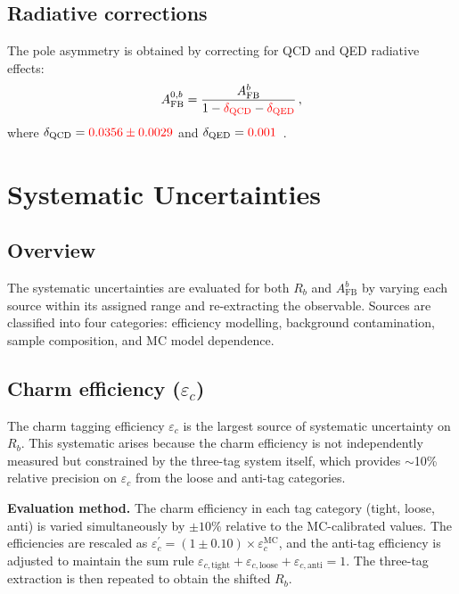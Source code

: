 \documentclass[11pt,a4paper]{article}
\newcommand{\external}[1]{\textcolor{red}{#1}}
\begin{document}
\subsection{Radiative corrections}

The pole asymmetry is obtained by correcting for QCD and QED radiative
effects:
\begin{equation}
  A_\mathrm{FB}^{0,b} = \frac{A_\mathrm{FB}^b}
    {1 - \external{\delta_\mathrm{QCD}} - \external{\delta_\mathrm{QED}}}\,,
  \label{eq:afb0b}
\end{equation}
where $\delta_\mathrm{QCD} = \external{0.0356 \pm 0.0029}$ and
$\delta_\mathrm{QED} = \external{0.001}$~\cite{LEP:EWWG:2005}.

\section{Systematic Uncertainties}
\label{sec:systematics}

\subsection{Overview}

The systematic uncertainties are evaluated for both $R_b$ and
$A_\mathrm{FB}^b$ by varying each source within its assigned range and
re-extracting the observable.  Sources are classified into four
categories: efficiency modelling, background contamination, sample
composition, and MC model dependence.

\subsection{Charm efficiency ($\varepsilon_c$)}
\label{sec:syst-epsc}

The charm tagging efficiency $\varepsilon_c$ is the largest source of
systematic uncertainty on $R_b$.  This systematic arises because the
charm efficiency is not independently measured but constrained by the
three-tag system itself, which provides $\sim$10\% relative precision on
$\varepsilon_c$ from the loose and anti-tag categories.

\textbf{Evaluation method.}
The charm efficiency in each tag category (tight, loose, anti) is varied
simultaneously by $\pm 10\%$ relative to the MC-calibrated values.  The
efficiencies are rescaled as $\varepsilon_c^{\prime} = (1 \pm 0.10) \times
\varepsilon_c^\mathrm{MC}$, and the anti-tag efficiency is adjusted to
maintain the sum rule $\varepsilon_{c,\mathrm{tight}} +
\varepsilon_{c,\mathrm{loose}} + \varepsilon_{c,\mathrm{anti}} = 1$.
The three-tag extraction is then repeated to obtain the shifted $R_b$.
\end{document}
